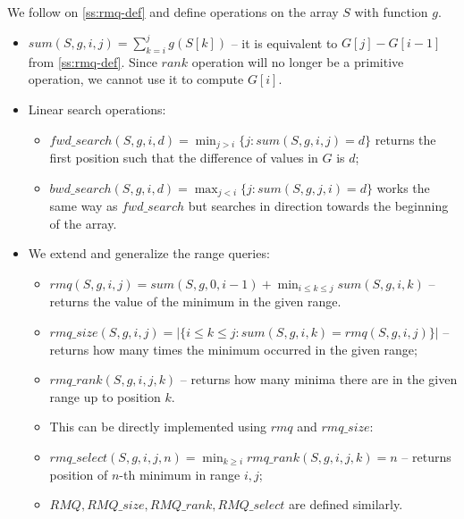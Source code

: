 We follow on \ref{ss:rmq-def} and define operations on the array $S$ with function $g$.
\begin{itemize}
	\item $sum(S, g, i, j) = \sum_{k=i}^j g(S[k])$ -- it is equivalent to $G[j] - G[i - 1]$ from \ref{ss:rmq-def}.
	Since $rank$ operation will no longer be a primitive operation, we cannot use it to compute $G[i]$.

	\item Linear search operations:
	\begin{itemize}
		\item $fwd\_search(S, g, i, d) = \min_{j > i} \{j : sum(S, g, i, j) = d\}$ returns the first position such that the difference of values in $G$ is $d$;
		\item $bwd\_search(S, g, i, d) = \max_{j < i} \{j : sum(S, g, j, i) = d\}$ works the same way as $fwd\_search$ but searches in direction towards the beginning of the array.
	\end{itemize}
	
	\item We extend and generalize the range queries:
	\begin{itemize}
		\item $rmq(S, g, i, j) = sum(S, g, 0, i - 1) + \min_{i \le k \le j} sum(S, g, i, k)$ -- returns the value of the minimum in the given range.
		\item $rmq\_size(S, g, i, j) = | \{ i \le k \le j : sum(S, g, i, k) = rmq(S, g, i, j) \} | $ -- returns how many times the minimum occurred in the given range;
		\item $rmq\_rank(S, g, i, j, k)$ -- returns how many minima there are in the given range up to position $k$.
		\item This can be directly implemented using $rmq$ and $rmq\_size$:
		\begin{algorithmic}
					\State {}
				\Else
					\State {}
				\EndIf
			\EndFunction
		\end{algorithmic}
		\item $rmq\_select(S, g, i, j, n) = \min_{k \ge i} rmq\_rank(S, g, i, j, k) = n$ -- returns position of $n$-th minimum in range $i, j$;
		\item $RMQ, RMQ\_size, RMQ\_rank, RMQ\_select$ are defined similarly.
	\end{itemize}
\end{itemize}

